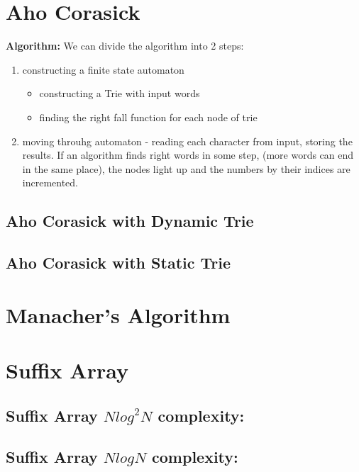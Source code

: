\documentclass[11pt]{report}
\begin{document}
\section{Aho Corasick}
\textbf{Algorithm:}
We can divide the algorithm into 2 steps:
\begin{enumerate}
	\item constructing a finite state automaton
	\begin{itemize}
		\item constructing a Trie with input words
		\item finding the right fall function for each node of trie
	\end{itemize}
\item moving throuhg automaton - reading each character from input, storing the results.  If an algorithm finds right words in some step, (more words can end in the same place), the nodes light up and the numbers by their indices are incremented.
\end{enumerate}

\subsection{Aho Corasick with Dynamic Trie}

\subsection{Aho Corasick with Static Trie}

\section{Manacher's Algorithm}

\section{Suffix Array}
\subsection{Suffix Array $N{log}^2N$ complexity:}

\newpage
\subsection{Suffix Array $NlogN$ complexity: }

\end{document}
